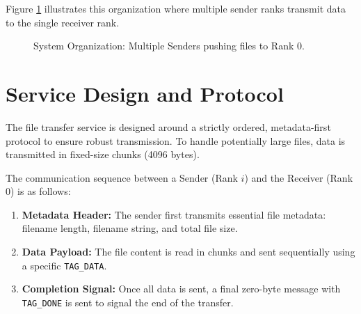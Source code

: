 \documentclass[11pt,a4paper]{article}
\begin{document}
Figure \ref{fig:system_org} illustrates this organization where multiple sender ranks transmit data to the single receiver rank.

\begin{figure}[ht]
    \centering
    \caption{System Organization: Multiple Senders pushing files to Rank 0.}
    \label{fig:system_org}
\end{figure}

\section{Service Design and Protocol}
The file transfer service is designed around a strictly ordered, metadata-first protocol to ensure robust transmission. To handle potentially large files, data is transmitted in fixed-size chunks (4096 bytes).

The communication sequence between a Sender (Rank $i$) and the Receiver (Rank 0) is as follows:
\begin{enumerate}
    \item \textbf{Metadata Header:} The sender first transmits essential file metadata: filename length, filename string, and total file size.
    
    \item \textbf{Data Payload:} The file content is read in chunks and sent sequentially using a specific \texttt{TAG\_DATA}.
    
    \item \textbf{Completion Signal:} Once all data is sent, a final zero-byte message with \texttt{TAG\_DONE} is sent to signal the end of the transfer.
\end{enumerate}
\end{document}
